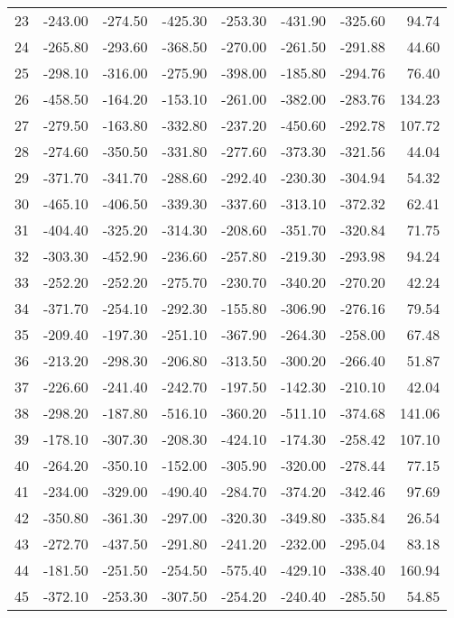\begin{longtable}{rrrrrrrr}
23 & -243.00 & -274.50 & -425.30 & -253.30 & -431.90 & -325.60 & 94.74  \\
24 & -265.80 & -293.60 & -368.50 & -270.00 & -261.50 & -291.88 & 44.60  \\
25 & -298.10 & -316.00 & -275.90 & -398.00 & -185.80 & -294.76 & 76.40  \\
26 & -458.50 & -164.20 & -153.10 & -261.00 & -382.00 & -283.76 & 134.23  \\
27 & -279.50 & -163.80 & -332.80 & -237.20 & -450.60 & -292.78 & 107.72  \\
28 & -274.60 & -350.50 & -331.80 & -277.60 & -373.30 & -321.56 & 44.04  \\
29 & -371.70 & -341.70 & -288.60 & -292.40 & -230.30 & -304.94 & 54.32  \\
30 & -465.10 & -406.50 & -339.30 & -337.60 & -313.10 & -372.32 & 62.41  \\
31 & -404.40 & -325.20 & -314.30 & -208.60 & -351.70 & -320.84 & 71.75  \\
32 & -303.30 & -452.90 & -236.60 & -257.80 & -219.30 & -293.98 & 94.24  \\
33 & -252.20 & -252.20 & -275.70 & -230.70 & -340.20 & -270.20 & 42.24  \\
34 & -371.70 & -254.10 & -292.30 & -155.80 & -306.90 & -276.16 & 79.54  \\
35 & -209.40 & -197.30 & -251.10 & -367.90 & -264.30 & -258.00 & 67.48  \\
36 & -213.20 & -298.30 & -206.80 & -313.50 & -300.20 & -266.40 & 51.87  \\
37 & -226.60 & -241.40 & -242.70 & -197.50 & -142.30 & -210.10 & 42.04  \\
38 & -298.20 & -187.80 & -516.10 & -360.20 & -511.10 & -374.68 & 141.06  \\
39 & -178.10 & -307.30 & -208.30 & -424.10 & -174.30 & -258.42 & 107.10  \\
40 & -264.20 & -350.10 & -152.00 & -305.90 & -320.00 & -278.44 & 77.15  \\
41 & -234.00 & -329.00 & -490.40 & -284.70 & -374.20 & -342.46 & 97.69  \\
42 & -350.80 & -361.30 & -297.00 & -320.30 & -349.80 & -335.84 & 26.54  \\
43 & -272.70 & -437.50 & -291.80 & -241.20 & -232.00 & -295.04 & 83.18  \\
44 & -181.50 & -251.50 & -254.50 & -575.40 & -429.10 & -338.40 & 160.94  \\
45 & -372.10 & -253.30 & -307.50 & -254.20 & -240.40 & -285.50 & 54.85  \\

\end{longtable}

